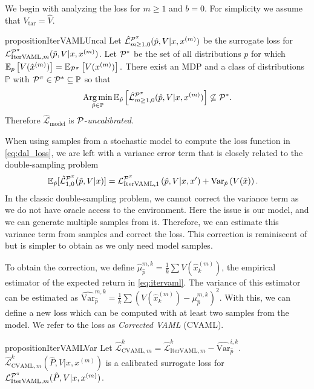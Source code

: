 We begin with analyzing the loss for $m\geq1$ and $b=0$.
For simplicity we assume that $V_\mathrm{tar} = \hat{V}$.
%
\begin{restatable}{proposition}{IterVAMLUncal}\label{prop:2_1}
    Let $\hat{\mathcal{L}}^{\P^\pi}_{m\geq1,0}(\hat{p},V|x,x^{(m)})$ be the surrogate loss for $\mathcal{L}_{\mathrm{IterVAML}, m}^{\P^\pi}(\hat{p}, V|x, x^{(m)})$.
    Let $\P^*$ be the set of all distributions $p$ for which $\EEX{p}{V(\hat{x}^{(m)})} = \EEX{\P^\pi}{V(x^{(m)})}.$
    There exist an MDP and a class of distributions $\mathbb{P}$ with $\P^\pi \in \P^* \subseteq \mathbb{P}$ so that $$\Argmin_{\hat{p} \in \mathbb{P}} \mathbb{E}_{\hat{p}}\left[\hat{\mathcal{L}}^{\P^\pi}_{m\geq1,0}(\hat{p},V|x,x^{(m)})\right] \not\subseteq \P^*.$$
    Therefore $\hat{\mathcal{L}}_\mathrm{model}$ is $\P$-\emph{uncalibrated}.
\end{restatable}
%
When using samples from a stochastic model to compute the loss function in \autoref{eq:dal_loss}, we are left with a variance error term that is closely related to the double-sampling problem
\begin{align}
 &\mathbb{E}_{\hat{p}}[\hat{\mathcal{L}}^{\P^\pi}_{1,0}(\hat{p},V|x)] = {\mathcal{L}}^{\P^\pi}_{\mathrm{IterVAML}, 1}\left(\hat{p},V|x,x'\right) + \mathrm{Var}_{\hat{p}}\left(V(\hat{x})\right).
\end{align}
%
In the classic double-sampling problem, we cannot correct the variance term as we do not have oracle access to the environment.
Here the issue is our model, and we can generate multiple samples from it.
Therefore, we can estimate this variance term from samples and correct the loss.
This correction is reminiscent of \textcite{antos2008learning} but is simpler to obtain as we only need model samples.

To obtain the correction, we define $\hat{\mu}_{\hat{p}}^{m,k} = \frac{1}{k}\sum V(\hat{x}_k^{(m)})$, the empirical estimator of the expected return in \autoref{eq:itervaml}.
The variance of this estimator can be estimated as $\widehat{\mathrm{Var}}_{\hat{p}}^{m,k} = \frac{1}{k} \sum (V(\hat{x}_k^{(m)}) - \mu_{\hat{p}}^{m,k})^2$.
With this, we can define a new loss which can be computed with at least two samples from the model.
We refer to the loss as \emph{Corrected VAML} (CVAML).

\begin{restatable}{proposition}{IterVAMLVar}\label{prop:2_2}
    Let $\hat{\mathcal{L}}_{\mathrm{CVAML}, m}^{k} = \hat{\mathcal{L}}^k_{\mathrm{IterVAML}, m} - \widehat{\mathrm{Var}}_{\hat{p}}^{i,k}.$
    $\hat{\mathcal{L}}_{\mathrm{CVAML}, m}^{k}(\hat{P}, V|x, x^{(m)})$ is a calibrated surrogate loss for $\mathcal{L}_{\mathrm{IterVAML}, m}^{\P^\pi}(\hat{P}, V|x, x^{(m)})$.
\end{restatable}


